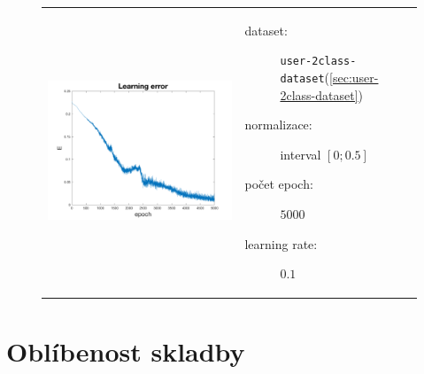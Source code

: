 \documentclass[thesis=M,czech]{FITthesis}[2012/06/26]
\begin{document}
\begin{figure}[htbp]
\begin{tabular}{p{}p{}}
    \begin{minipage}{.5\textwidth}
    \centering
    \includegraphics[scale=0.3]{err_user2.png}
    \label{fig:fig1}
    \end{minipage}
    &
    \begin{minipage}{.5\textwidth}
		\begin{description}
            \item[dataset:] \texttt{user-2class-dataset}(\ref{sec:user-2class-dataset})
            \item[normalizace:] interval $[0;0.5]$
            \item[počet epoch:] $5000$
            \item[learning rate:] $0.1$
        \end{description}
\end{minipage}
\end{tabular}
\end{figure}


\section{Oblíbenost skladby}\label{exp:hotfail}
\end{document}
